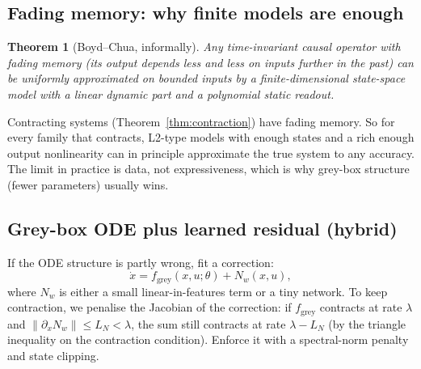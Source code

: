 \documentclass[11pt]{article}
\theoremstyle{plain}
\newtheorem{theorem}{Theorem}[section]
\theoremstyle{definition}
\theoremstyle{remark}
\newcommand{\norm}[1]{\left\lVert #1 \right\rVert}
\begin{document}
\subsection{Fading memory: why finite models are enough}
\begin{theorem}[Boyd--Chua, informally]
Any time-invariant causal operator with \emph{fading memory} (its output depends less and less on inputs further in the past) can be uniformly approximated on bounded inputs by a finite-dimensional state-space model with a linear dynamic part and a polynomial static readout.
\end{theorem}
Contracting systems (Theorem~\ref{thm:contraction}) have fading memory. So for every family that contracts, L2-type models with enough states and a rich enough output nonlinearity can in principle approximate the true system to any accuracy. The limit in practice is data, not expressiveness, which is why grey-box structure (fewer parameters) usually wins.

\subsection{Grey-box ODE plus learned residual (hybrid)}
If the ODE structure is partly wrong, fit a correction:
\begin{equation}
\dot x=f_{\text{grey}}(x,u;\theta)+N_w(x,u),
\end{equation}
where $N_w$ is either a small linear-in-features term or a tiny network. To keep contraction, we penalise the Jacobian of the correction: if $f_{\text{grey}}$ contracts at rate $\lambda$ and $\norm{\partial_xN_w}\le L_N<\lambda$, the sum still contracts at rate $\lambda-L_N$ (by the triangle inequality on the contraction condition). Enforce it with a spectral-norm penalty and state clipping.
\end{document}
